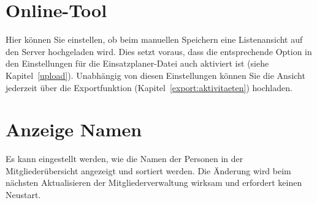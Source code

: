 \section{Online-Tool}
Hier können Sie einstellen, ob beim manuellen Speichern eine Listenansicht auf den Server hochgeladen wird.
Dies setzt voraus, dass die entsprechende Option in den Einstellungen für die Einsatzplaner-Datei auch aktiviert ist
(siehe Kapitel~\ref{upload}).
Unabhängig von diesen Einstellungen können Sie die Ansicht jederzeit über die Exportfunktion (Kapitel~\ref{export:aktivitaeten}) hochladen.


\section{Anzeige Namen}
Es kann eingestellt werden, wie die Namen der Personen in der Mitgliederübersicht angezeigt und sortiert werden.
Die Änderung wird beim nächsten Aktualisieren der Mitgliederverwaltung wirksam und erfordert keinen Neustart.
